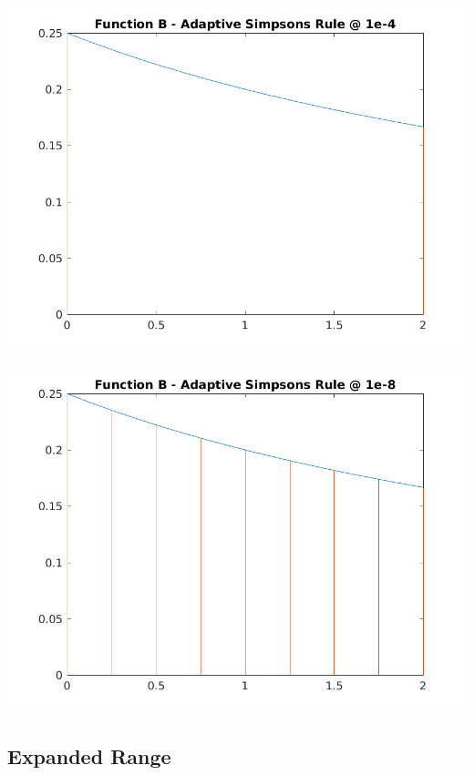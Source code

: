 \documentclass[a4paper]{article}
\begin{document}
\begin{center}
	\includegraphics[width=1\textwidth]{../output/b_adaptive_simpsons_4.png}
	\label{fig:b_adap4}
\end{center}

\begin{center}
	\includegraphics[width=1\textwidth]{../output/b_adaptive_simpsons_8.png}
	\label{fig:b_adap8}
\end{center}






\subsection{Expanded Range}\label{results:expanded}
\end{document}
